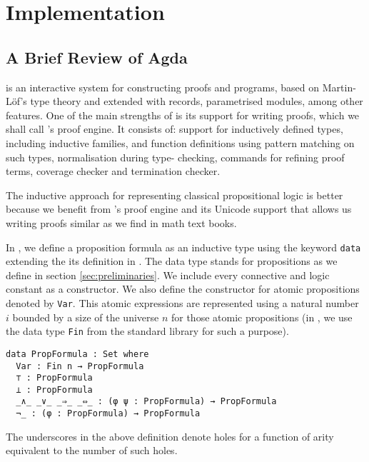 \documentclass[../main.tex]{subfiles}
\begin{document}

\section{Implementation}
\label{sec:implementation}


\subsection{A Brief Review of Agda}
\label{ssec:agda-definition}

\Agda is an interactive system for constructing proofs and programs,
based on Martin-L\"{o}f's type theory and extended with records, parametrised
modules, among other features.
One of the main strengths of \Agda is its support for writing proofs,
which we shall call \Agda's proof engine. It consists of: support for
inductively defined types, including inductive families, and function
definitions using pattern matching on such types, normalisation during type-
checking, commands for refining proof terms, coverage checker and termination
checker.

The inductive approach for representing classical propositional logic
is better because we benefit from \Agda's proof engine and its Unicode
support that allows us writing proofs similar as we find in math text books.

In \Agda, we define a proposition formula
as an inductive type using the keyword \texttt{data} extending the
its definition in \cite{Altenkirch2015}.  
The  data type stands for propositions
as we define in section \ref{sec:preliminaries}.
We include every connective and logic constant as a constructor.
We also define the constructor for atomic propositions denoted by
\verb!Var!. This atomic expressions are represented using a natural 
number $i$ bounded by a size of the universe $n$ for those atomic 
propositions (in \Agda, we use the data type \verb!Fin! from the 
standard  library for such a purpose).

\begin{verbatim}
data PropFormula : Set where
  Var : Fin n → PropFormula
  ⊤ : PropFormula
  ⊥ : PropFormula
  _∧_ _∨_ _⇒_ _⇔_ : (φ ψ : PropFormula) → PropFormula
  ¬_ : (φ : PropFormula) → PropFormula
\end{verbatim}

\begin{remark}
The underscores in the above definition denote holes for a function of arity equivalent to the number of such holes.
\end{remark}
\end{document}

